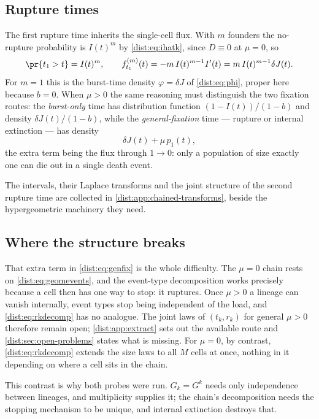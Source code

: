 \subsection{Rupture times}
\label{dist:sec:rupture-times}

The first rupture time inherits the single-cell flux. With $m$ founders the
no-rupture probability is $I(t)^m$ by \cref{dist:eq:ihatk}, since $D\equiv0$
at $\mu=0$, so
\begin{equation}
\pr{t_1>t}=I(t)^m,
\qquad
f_{t_1}^{(m)}(t)=-m\,I(t)^{m-1}I'(t)=m\,I(t)^{m-1}\delta J(t).
\label{dist:eq:t1m}
\end{equation}
For $m=1$ this is the burst-time density $\varphi=\delta J$ of
\cref{dist:eq:phi}, proper here because $b=0$. When $\mu>0$ the same
reasoning must distinguish the two fixation routes: the \emph{burst-only}
time has distribution function $(1-I(t))/(1-b)$ and density
$\delta J(t)/(1-b)$, while the \emph{general-fixation} time --- rupture or
internal extinction --- has density
\begin{equation}
\delta J(t)+\mu\,p_1(t),
\label{dist:eq:genfix}
\end{equation}
the extra term being the flux through $1\to0$: only a population of size
exactly one can die out in a single death event.

The intervals, their Laplace transforms and the joint structure of the second
rupture time are collected in \cref{dist:app:chained-transforms}, beside the
hypergeometric machinery they need.

\subsection{Where the structure breaks}
\label{dist:sec:chained-scope}

That extra term in \cref{dist:eq:genfix} is the whole difficulty. The
$\mu=0$ chain rests on \cref{dist:eq:geomevents}, and the event-type
decomposition works precisely because a cell then has one way to stop: it
ruptures. Once $\mu>0$ a lineage can vanish internally, event types stop being
independent of the load, and \cref{dist:eq:rkdecomp} has no analogue. The
joint laws of $(t_k,r_k)$ for general $\mu>0$ therefore remain open;
\cref{dist:app:extract} sets out the available route and
\cref{dist:sec:open-problems} states what is missing. For $\mu=0$, by
contrast, \cref{dist:eq:rkdecomp} extends the size laws to all $M$ cells at
once, nothing in it depending on where a cell sits in the chain.

This contrast is why both probes were run. $G_k=G^k$ needs only independence
between lineages, and multiplicity supplies it; the chain's decomposition
needs the stopping mechanism to be unique, and internal extinction destroys
that.

